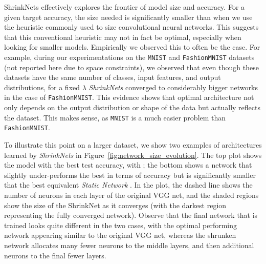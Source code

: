 ShrinkNets effectively explores the frontier of model size and accuracy. For a
given target accuracy, the size needed is significantly smaller than when we use the
 heuristic commonly used to size convolutional neural networks.
This suggests that this conventional heuristic may not in fact be optimal,
especially when looking for smaller models.  Empirically we observed this to
often be the case.  For example, during our experimentations on the
\texttt{MNIST} \cite{Lecun1998} and \texttt{FashionMNIST} \cite{Xiao2017}
datasets (not reported here due to space constraints), we observed that even
though these datasets have the same number of classes, input features, and
output distributions, for a fixed $\lambda$ \textit{ShrinkNets} converged to
considerably bigger networks in the case of \texttt{FashionMNIST}. This evidence
shows that optimal architecture not only depends on the output distribution or
shape of the data but actually reflects the dataset.  This makes sense, as
\texttt{MNIST} is a much easier problem than \texttt{FashionMNIST}.

To illustrate this point on a larger dataset, we show two examples of
architectures learned by \textit{ShrinkNets} in
Figure~\ref{fig:network_size_evolution}.  The top plot shows the model with the
best test accuracy, with ; the bottom shows a network that slightly under-performs the best in
terms of accuracy but is significantly smaller that the best equivalent
\textit{Static Network} .  In the plot, the dashed line
shows the number of neurons in each layer of the original VGG net, and the
shaded regions show the size of the ShrinkNet as it converges (with the darkest
region representing the fully converged network).  Observe that the final
network that is trained looks quite different in the two cases, with the optimal
performing network appearing similar to the original VGG net, whereas the
shrunken network allocates many fewer neurons to the middle layers, and then
additional neurons to the final fewer layers.


